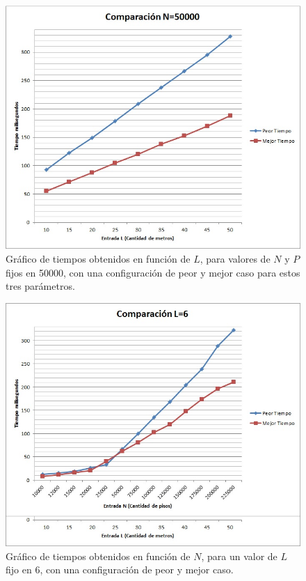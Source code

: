 \begin{figure}[H]
\centering
\includegraphics[scale=0.6]{../ComparacionEj2Nfijo.jpg}
\caption{Gráfico de tiempos obtenidos en función de $L$, para valores de $ N $ y $ P $ fijos en 50000, con una configuración de peor y mejor caso para estos tres parámetros.}
\label{ComparacionCasoNfijo}
\end{figure}

\begin{figure}[H]
\centering
\includegraphics[scale=0.6]{../ComparacionEj2Lfijo.jpg}
\caption{Gráfico de tiempos obtenidos en función de $N$, para un valor de $ L $  fijo en 6, con una configuración de peor y mejor caso. }
\label{ComparacionCasoLfijo}
\end{figure}




